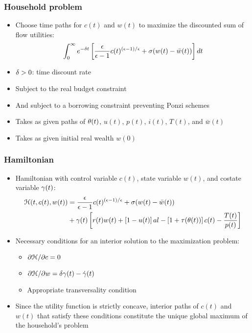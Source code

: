 \documentclass[11pt,aspectratio=169,xcolor={dvipsnames},hyperref={pdftex,pdfpagemode=UseNone,hidelinks,pdfdisplaydoctitle=true},usepdftitle=false]{beamer}
\begin{document}
\begin{frame}
\frametitle{Household problem}
\begin{itemize}
\item Choose time paths for $c(t)$ and $w(t)$ to maximize the discounted sum of flow utilities:
\begin{equation*}
\int_{0}^{\infty}e^{-\delta t} \left[ \frac{\epsilon}{\epsilon-1}  c(t)^{(\epsilon-1)/\epsilon}+\sigma(w(t)-\bar{w}(t)) \right]dt
\end{equation*}
\item $\delta>0$: time discount rate
\item Subject to the real budget constraint
\item And subject to a borrowing constraint preventing Ponzi schemes
\item Takes as given paths of $\theta(t)$, $u(t)$, $p(t)$, $i(t)$, $T(t)$, and $\bar{w}(t)$
\item Takes as given initial real wealth $w(0)$
\end{itemize}	
\end{frame}

\begin{frame}
\frametitle{Hamiltonian}
\begin{itemize}
\item Hamiltonian with control variable $c(t)$, state variable $w(t)$, and costate variable $\gamma(t)$:
\begin{align*}
\mathcal{H}(t,c(t),w(t))&= \frac{\epsilon}{\epsilon-1}  c(t)^{(\epsilon-1)/\epsilon}+\sigma(w(t)-\bar{w}(t)) \\
&+\gamma(t) \left[ r(t) w(t) + \left[ 1-u(t) \right] al - \left[ 1+\tau(\theta(t)) \right] c(t) - \frac{T(t)}{p(t)} \right]
\end{align*}
\item Necessary conditions for an interior solution to the maximization problem:
\begin{itemize}
\item $\pdx{\Hc}{c}=0$
\item $\pdx{\Hc}{w}=\d \g(t) -\dot{\g}(t)$
\item Appropriate transversality condition
\end{itemize}
\item Since the utility function is strictly concave, interior paths of $c(t)$ and $w(t)$ that satisfy these conditions constitute the unique global maximum of the household's problem
\end{itemize}	
\end{frame}
\end{document}
